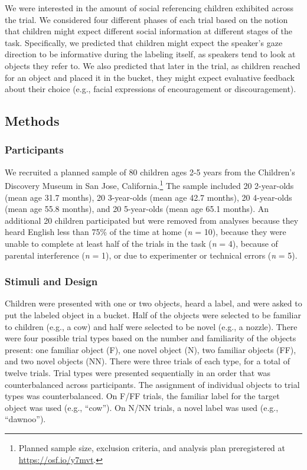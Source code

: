 \documentclass[english,man]{apa6}
\theoremstyle{definition}
\theoremstyle{definition}
\theoremstyle{definition}
\theoremstyle{remark}
\begin{document}
We were interested in the amount of social referencing children
exhibited across the trial. We considered four different phases of each
trial based on the notion that children might expect different social
information at different stages of the task. Specifically, we predicted
that children might expect the speaker's gaze direction to be
informative during the labeling itself, as speakers tend to look at
objects they refer to. We also predicted that later in the trial, as
children reached for an object and placed it in the bucket, they might
expect evaluative feedback about their choice (e.g., facial expressions
of encouragement or discouragement).

\subsection{Methods}\label{methods}

\subsubsection{Participants}\label{participants}

We recruited a planned sample of 80 children ages 2-5 years from the
Children's Discovery Museum in San Jose, California.\footnote{Planned
  sample size, exclusion criteria, and analysis plan preregistered at
  \url{https://osf.io/y7mvt}.} The sample included 20 2-year-olds (mean
age 31.7 months), 20 3-year-olds (mean age 42.7 months), 20 4-year-olds
(mean age 55.8 months), and 20 5-year-olds (mean age 65.1 months). An
additional 20 children participated but were removed from analyses
because they heard English less than 75\% of the time at home (\emph{n}
= 10), because they were unable to complete at least half of the trials
in the task (\emph{n} = 4), because of parental interference (\emph{n} =
1), or due to experimenter or technical errors (\emph{n} = 5).

\subsubsection{Stimuli and Design}\label{stimuli-and-design}

Children were presented with one or two objects, heard a label, and were
asked to put the labeled object in a bucket. Half of the objects were
selected to be familiar to children (e.g., a cow) and half were selected
to be novel (e.g., a nozzle). There were four possible trial types based
on the number and familiarity of the objects present: one familiar
object (F), one novel object (N), two familiar objects (FF), and two
novel objects (NN). There were three trials of each type, for a total of
twelve trials. Trial types were presented sequentially in an order that
was counterbalanced across participants. The assignment of individual
objects to trial types was counterbalanced. On F/FF trials, the familiar
label for the target object was used (e.g., \enquote{cow}). On N/NN
trials, a novel label was used (e.g., \enquote{dawnoo}).
\end{document}
